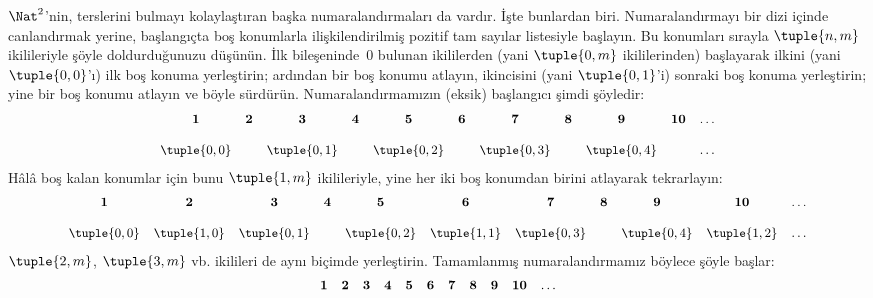 



\begin{explain}
$\Nat^2$'nin, terslerini bulmayı kolaylaştıran başka numaralandırmaları da
vardır. İşte bunlardan biri. Numaralandırmayı bir dizi içinde canlandırmak
yerine, başlangıçta boş konumlarla ilişkilendirilmiş pozitif tam sayılar
listesiyle başlayın. Bu konumları sırayla $\tuple{n,m}$ ikilileriyle şöyle
doldurduğunuzu düşünün. İlk bileşeninde~$0$ bulunan ikililerden (yani
$\tuple{0,m}$ ikililerinden) başlayarak ilkini (yani $\tuple{0,0}$'ı) ilk
boş konuma yerleştirin; ardından bir boş konumu atlayın, ikincisini (yani
$\tuple{0,1}$'i) sonraki boş konuma yerleştirin; yine bir boş konumu atlayın
ve böyle sürdürün. Numaralandırmamızın (eksik) başlangıcı şimdi şöyledir:
\[\small
\begin{array}{@{}c c c c c c c c c c c@{}}
\mathbf 1 & \mathbf 2 & \mathbf 3 & \mathbf 4 & \mathbf 5 & \mathbf 6 & \mathbf 7 & \mathbf 8 & \mathbf 9 & \mathbf{10} & \dots \\ \\
\tuple{0,0} &  & \tuple{0,1} &  & \tuple{0,2} &  & \tuple{0,3} & & \tuple{0,4} &  & \dots \\
\end{array}
\]
Hâlâ boş kalan konumlar için bunu $\tuple{1,m}$ ikilileriyle, yine her iki
boş konumdan birini atlayarak tekrarlayın:
\[\small
\begin{array}{@{}c c c c c c c c c c c@{}}
\mathbf 1 & \mathbf 2 & \mathbf 3 & \mathbf 4 & \mathbf 5 & \mathbf 6 & \mathbf 7 & \mathbf 8 & \mathbf 9 & \mathbf{10} & \dots \\ \\
\tuple{0,0} & \tuple{1,0} & \tuple{0,1} &  & \tuple{0,2} & \tuple{1,1} &
\tuple{0,3} & & \tuple{0,4} &  \tuple{1,2} & \dots \\
\end{array}
\]
$\tuple{2,m}$, $\tuple{3,m}$ vb. ikilileri de aynı biçimde yerleştirin.
Tamamlanmış numaralandırmamız böylece şöyle başlar:
\[\small
\begin{array}{@{}cc c c c c c c c c c@{}}
\mathbf 1 & \mathbf 2 & \mathbf 3 & \mathbf 4 & \mathbf 5 & \mathbf 6 & \mathbf 7 & \mathbf 8 & \mathbf 9 & \mathbf{10} & \dots \\ \\

\end{array}\]
\end{explain}
